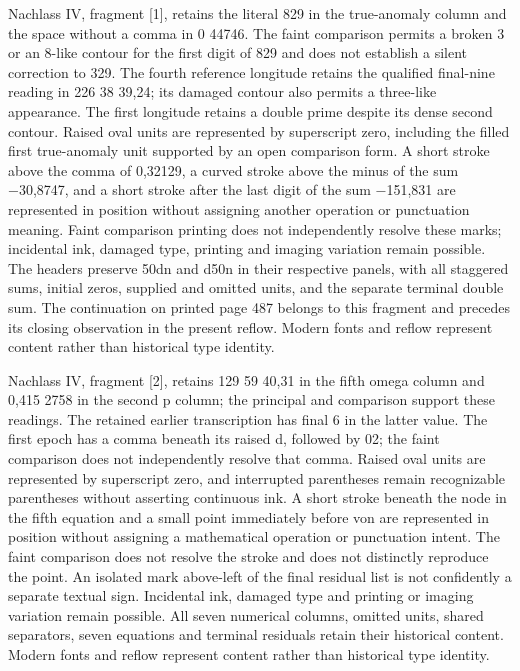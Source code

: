 Nachlass IV, fragment [1], retains the literal 829 in the true-anomaly column and the space without a comma in 0 44746. The faint comparison permits a broken 3 or an 8-like contour for the first digit of 829 and does not establish a silent correction to 329. The fourth reference longitude retains the qualified final-nine reading in 226 38 39,24; its damaged contour also permits a three-like appearance. The first longitude retains a double prime despite its dense second contour. Raised oval units are represented by superscript zero, including the filled first true-anomaly unit supported by an open comparison form. A short stroke above the comma of 0,32129, a curved stroke above the minus of the sum −30,8747, and a short stroke after the last digit of the sum −151,831 are represented in position without assigning another operation or punctuation meaning. Faint comparison printing does not independently resolve these marks; incidental ink, damaged type, printing and imaging variation remain possible. The headers preserve 50dn and d50n in their respective panels, with all staggered sums, initial zeros, supplied and omitted units, and the separate terminal double sum. The continuation on printed page 487 belongs to this fragment and precedes its closing observation in the present reflow. Modern fonts and reflow represent content rather than historical type identity.

Nachlass IV, fragment [2], retains 129 59 40,31 in the fifth omega column and 0,415 2758 in the second p column; the principal and comparison support these readings. The retained earlier transcription has final 6 in the latter value. The first epoch has a comma beneath its raised d, followed by 02; the faint comparison does not independently resolve that comma. Raised oval units are represented by superscript zero, and interrupted parentheses remain recognizable parentheses without asserting continuous ink. A short stroke beneath the node in the fifth equation and a small point immediately before von are represented in position without assigning a mathematical operation or punctuation intent. The faint comparison does not resolve the stroke and does not distinctly reproduce the point. An isolated mark above-left of the final residual list is not confidently a separate textual sign. Incidental ink, damaged type and printing or imaging variation remain possible. All seven numerical columns, omitted units, shared separators, seven equations and terminal residuals retain their historical content. Modern fonts and reflow represent content rather than historical type identity.

